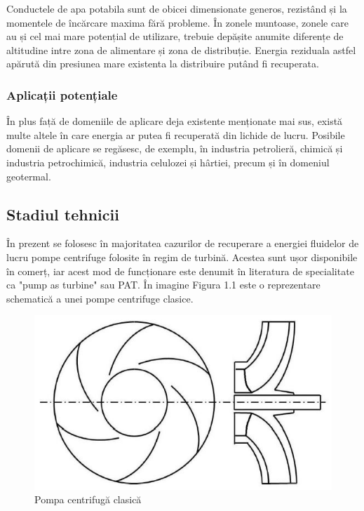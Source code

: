 Conductele de apa potabila sunt de obicei dimensionate generos, rezistând și la momentele de încărcare maxima fără probleme. În zonele muntoase, zonele care au și cel mai mare potențial de utilizare, trebuie depășite anumite diferențe de altitudine intre zona de alimentare și zona de distribuție. Energia reziduala astfel apărută din presiunea mare existenta la distribuire putând fi recuperata.


\subsubsection{Aplicații potențiale}

În plus față de domeniile de aplicare deja existente menționate mai sus, există multe altele în care energia ar putea fi recuperată din lichide de lucru. Posibile domenii de aplicare se regăsesc, de exemplu, în industria petrolieră, chimică și industria petrochimică, industria celulozei și hârtiei, precum și în domeniul geotermal.


\subsection{Stadiul tehnicii}

În prezent se folosesc în majoritatea cazurilor de recuperare a energiei fluidelor de lucru pompe centrifuge folosite în regim de turbină. Acestea sunt ușor disponibile în comerț, iar acest mod de funcționare este denumit în literatura de specialitate ca "pump as turbine" sau PAT. În imagine Figura 1.1 este o reprezentare schematică a unei pompe centrifuge clasice.

\begin{figure}[h!]
	\centering
	\includegraphics[scale=0.7]{figures/centrifugal-pump.jpg}
	\caption{Pompa centrifugă clasică \cite{neipp2017zweistufige}}
	\label{Pompa centrifugă clasică \u{a}}
\end{figure}

